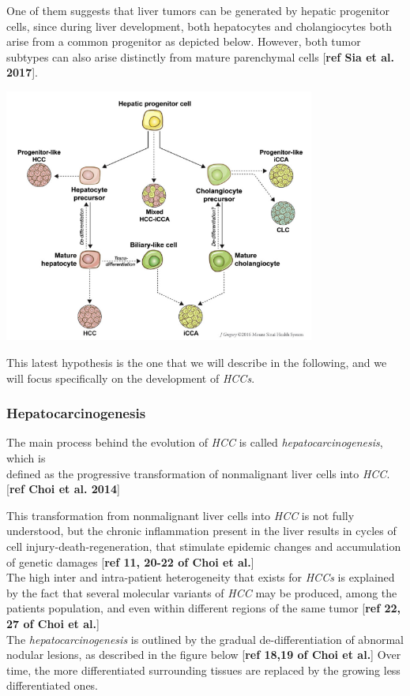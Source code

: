 \documentclass[]{article}
\begin{document}
One of them suggests that liver tumors can be generated by hepatic
progenitor cells, since during liver development, both hepatocytes and
cholangiocytes both arise from a common progenitor as depicted below.
However, both tumor subtypes can also arise distinctly from mature
parenchymal cells {[}\textbf{ref Sia et al. 2017}{]}.

\includegraphics[width=4.02101in,height=3.28628in]{./images/media/image6.png}

This latest hypothesis is the one that we will describe in the
following, and we will focus specifically on the development of
\emph{HCCs}.

\subsubsection{Hepatocarcinogenesis}\label{hepatocarcinogenesis}

The main process behind the evolution of \emph{HCC} is called
\emph{hepatocarcinogenesis}, which is\\
defined as the progressive transformation of nonmalignant liver cells
into \emph{HCC}. {[}\textbf{ref Choi et al. 2014}{]}

This transformation from nonmalignant liver cells into \emph{HCC} is not
fully understood, but the chronic inflammation present in the liver
results in cycles of cell injury-death-regeneration, that stimulate
epidemic changes and accumulation of genetic damages {[}\textbf{ref 11,
20-22 of Choi et al.}{]}\\
The high inter and intra-patient heterogeneity that exists for
\emph{HCCs} is explained by the fact that several molecular variants of
\emph{HCC} may be produced, among the patients population, and even
within different regions of the same tumor {[}\textbf{ref 22, 27 of Choi
et al.}{]}\\
The \emph{hepatocarcinogenesis} is outlined by the gradual
de-differentiation of abnormal nodular lesions, as described in the
figure below {[}\textbf{ref 18,19 of Choi et al.}{]} Over time, the more
differentiated surrounding tissues are replaced by the growing less
differentiated ones.
\end{document}

